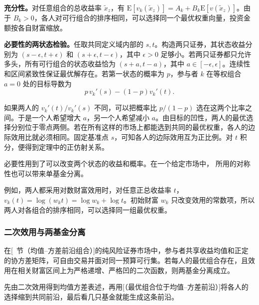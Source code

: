 \begin{solution}[label-content={证明},blank-type=none]
\textbf{充分性。}对任意组合的总收益率 $\tilde x_z$，有 $\mathrm E[v_k(\tilde x_z)]=A_k+B_k\mathrm E[v(\tilde x_z)]$。由于 $B_k>0$，各人对可行组合的排序相同，可以选择同一个最优权重向量，投资金额按各自财富缩放。

\textbf{必要性的两状态检验。}任取共同定义域内部的 $s,t$。构造两只证券，其状态收益分别为 $(s-\epsilon,t+\epsilon)$ 和 $(s+\epsilon,t-\epsilon)$，其中 $\epsilon>0$ 足够小。若两只证券都只允许多头，所有可行组合的状态收益恰为 $(s+a,t-a)$，其中 $a\in[-\epsilon,\epsilon]$。连续性和区间紧致性保证最优解存在。若第一状态的概率为 $p$，参与者 $k$ 在等权组合 $a=0$ 处的目标导数为
\[
 p\,v_k'(s)-(1-p)v_k'(t).
\]

如果两人的 $v_k'(t)/v_k'(s)$ 不同，可以把概率比 $p/(1-p)$ 选在这两个比率之间。于是一个人希望增大 $a$，另一个人希望减小 $a$。由目标的凹性，两人的最优选择分别位于零点两侧。若在所有这样的市场上都能选到共同的最优权重，各人的边际效用比就必须相同。固定基准点 $s$，可知各人的边际效用互为正比例。对 $t$ 积分，便得到定理中的正仿射关系。
\end{solution}

必要性用到了可以改变两个状态的收益和概率。在一个给定市场中， 所用的对称性也可以带来单基金分离。

例如，两人都采用对数财富效用时，对任意正总收益率 $t$，$v_k(t)=\log(w_kt)=\log w_k+\log t$。初始财富 $w_k$ 只改变效用的常数项，所以两人对各组合的排序相同，可以选择同一组最优权重。

\subsubsection{二次效用与两基金分离}
\begin{tcolorbox}[knowledge]
 在[~节（均值--方差前沿组合）]的纯风险证券市场中，参与者共享收益均值和正定的协方差矩阵，可自由交易并面对同一预算可行集。若每人的最优组合存在，且效用在相关财富区间上为严格递增、严格凹的二次函数，则两基金分离成立。
\end{tcolorbox}
先由二次效用得到均值方差表述，再用[（最优组合位于均值--方差前沿）]将各人的选择缩到共同前沿，最后看几只基金就能生成这条前沿。

